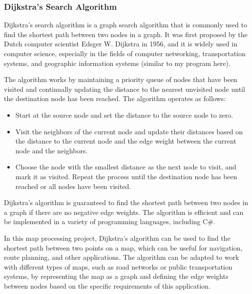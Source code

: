 \begin{FlushLeft}
    \subsubsection{Dijkstra's Search Algorithm}
    Dijkstra's search algorithm is a graph search algorithm that is commonly used to find the shortest path between two nodes in a graph. It was first proposed by the Dutch computer scientist Edsger W. Dijkstra in 1956, and it is widely used in computer science, especially in the fields of computer networking, transportation systems, and geographic information systems (similar to my program here). \\ \bk

    The algorithm works by maintaining a priority queue of nodes that have been visited and continually updating the distance to the nearest unvisited node until the destination node has been reached. The algorithm operates as follows:\\

    \begin{itemize}
    \item Start at the source node and set the distance to the source node to zero.

    \item Visit the neighbors of the current node and update their distances based on the distance to the current node and the edge weight between the current node and the neighbors.

    \item Choose the node with the smallest distance as the next node to visit, and mark it as visited. Repeat the process until the destination node has been reached or all nodes have been visited.
    \end{itemize}

    Dijkstra's algorithm is guaranteed to find the shortest path between two nodes in a graph if there are no negative edge weights. The algorithm is efficient and can be implemented in a variety of programming languages, including C#.\\ \bk

    In this map processing project, Dijkstra's algorithm can be used to find the shortest path between two points on a map, which can be useful for navigation, route planning, and other applications. The algorithm can be adapted to work with different types of maps, such as road networks or public transportation systems, by representing the map as a graph and defining the edge weights between nodes based on the specific requirements of this application. \\ \bk


\end{FlushLeft}

